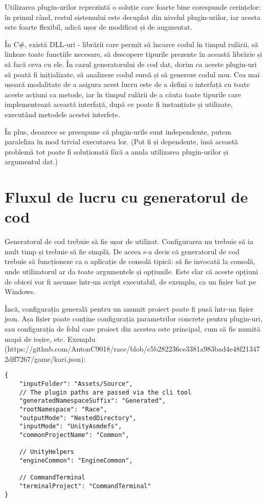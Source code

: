 \documentclass{report}
\begin{document}
Utilizarea plugin-urilor reprezintă o soluție care foarte bine corespunde cerințelor: în primul rând, restul sistemului este decuplat din nivelul plugin-urilor, iar acesta este foarte flexibil, adică ușor de modificat și de augmentat.

În C#, există DLL-uri - librării care permit să încarce codul în timpul rulării, să linkeze toate funcțiile necesare, să descopere tipurile prezente în această librărie și să facă ceva cu ele.
În cazul generatorului de cod dat, dorim ca aceste plugin-uri să poată fi inițializate, să analizeze codul sursă și să genereze codul nou.
Cea mai ușoară modalitate de a asigura acest lucru este de a defini o interfață cu toate aceste acțiuni ca metode, iar în timpul rulării de a căuta toate tipurile care implementează această interfață, după ce poate fi instanțiate și utilizate, executând metodele acestei interfețe. 

În plus, deoarece se presupune că plugin-urile sunt independente, putem paraleliza în mod trivial executarea lor.
(Pot fi și dependente, însă această problemă tot poate fi soluționată fără a anula utilizarea plugin-urilor și argumentul dat.)

\section{Fluxul de lucru cu generatorul de cod}

Generatorul de cod trebuie să fie ușor de utilizat.
Configurarea nu trebuie să ia mult timp și trebuie să fie simplă.
De aceea s-a decis că generatorul de cod trebuie să funcționeze ca o aplicație de consolă tipică: să fie invocată la consolă, unde utilizatorul ar da toate argumentele și opțiunile.
Este clar că aceste opțiuni de obicei vor fi ascunse într-un script executabil, de exemplu, ca un fișier bat pe Windows.

Încă, configurația generală pentru un anumit proiect poate fi pusă într-un fișier json.
Așa fișier poate conține configurația parametrilor concrete pentru plugin-uri, sau configurația de felul care proiect din acestea este principal, cum să fie numită mapă de ieșire, etc. Exemplu (https://github.com/AntonC9018/race/blob/c5b282236ce3381a983bad4e48f213472dff7267/game/kari.json):

\begin{lstlisting}
{
    "inputFolder": "Assets/Source",
    // The plugin paths are passed via the cli tool
    "generatedNamespaceSuffix": "Generated",
    "rootNamespace": "Race",
    "outputMode": "NestedDirectory",
    "inputMode": "UnityAsmdefs",
    "commonProjectName": "Common",

    // UnityHelpers
    "engineCommon": "EngineCommon",

    // CommandTerminal
    "terminalProject": "CommandTerminal"
}
\end{lstlisting}
\end{document}
